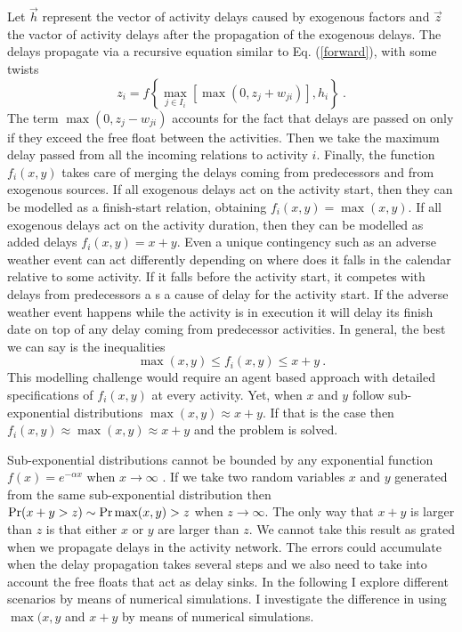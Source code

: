 \documentclass[reprint,aps,prl,amsmath,amssymb,superscriptaddress,showpacs]{revtex4-1}
\begin{document}
Let $\vec{h}$ represent the vector of activity delays caused by exogenous factors and $\vec{z}$ the vactor of activity delays after the propagation of the exogenous delays. The delays propagate via a recursive equation similar to Eq. (\ref{forward}), with some twists
\begin{equation}
z_i = f\left\{\max_{j\in I_i} \left[\max(0,z_j+w_{ji})\right] , h_i\right\}\ .
\label{forward_delay} 
\end{equation}
% 
The term $\max(0,z_j-w_{ji})$ accounts for the fact that delays are passed on only if they exceed the free float between the activities. Then we take the maximum delay passed from all the incoming relations to activity $i$. Finally, the function $f_i(x,y)$ takes care of merging the delays coming from predecessors and from exogenous sources. If all exogenous delays act on the activity start, then they can be modelled as a finish-start relation, obtaining $f_i(x,y)=\max(x,y)$. If all exogenous delays act on the activity duration, then they can be modelled as added delays $f_i(x,y)=x+y$. Even a unique contingency such as an adverse weather event can act differently depending on where does it falls in the calendar relative to some activity. If it falls before the activity start, it competes with delays from predecessors a s a cause of delay for the activity start. If the adverse weather event happens while the activity is in execution it will delay its finish date on top of any delay coming from predecessor activities. In general, the best we can say is the inequalities
%
\begin{equation}
\max(x,y)\leq f_i(x,y)\leq x+y\ .
\label{f_bounds}
\end{equation}
%
This modelling challenge would require an agent based approach with detailed specifications of $f_i(x,y)$ at every activity. Yet, when $x$ and $y$ follow sub-exponential distributions $\max(x,y)\approx x+y$. If that is the case then $f_i(x,y)\approx \max(x,y)\approx x+y$ and the problem is solved. 

Sub-exponential distributions cannot be bounded by any exponential function $f(x) = e^{-\alpha x}$  when $x\rightarrow\infty$ \cite{foss13}. If we take two random variables $x$ and $y$ generated from the same sub-exponential distribution then ${\rm Pr}(x+y>z)\sim {\rm Pr}\max(x,y)>z$ when $z\rightarrow\infty$. The only way that $x+y$ is larger than $z$ is that either $x$ or $y$ are larger than $z$. We cannot take this result as grated when we propagate delays in the activity network. The errors could accumulate when the delay propagation takes several steps and we also need to take into account the free floats that act as delay sinks. In the following I explore different scenarios by means of numerical simulations. I investigate the difference in using $\max(x,y$ and $x+y$ by means of numerical simulations.
\end{document}

